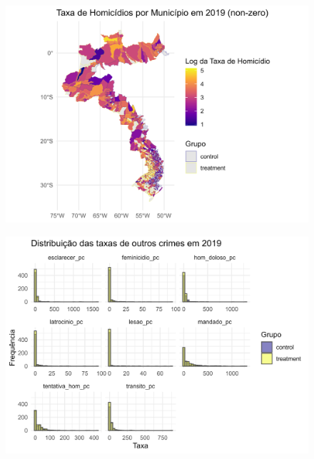 \documentclass{beamer}
\begin{document}
\begin{frame}
	\begin{figure}
		\centering
		\includegraphics[width=1\linewidth]{figures/mapa_hom_2019_nonzero}
		\label{fig:histoghom}
	\end{figure}
\end{frame}

\begin{frame}
	\begin{figure}
		\centering
		\includegraphics[width=1\linewidth]{figures/histog_outros}
		\label{fig:histoghom}
	\end{figure}
	
\end{frame}
\end{document}
